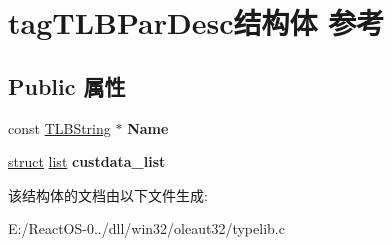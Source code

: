\hypertarget{structtag_t_l_b_par_desc}{}\section{tag\+T\+L\+B\+Par\+Desc结构体 参考}
\label{structtag_t_l_b_par_desc}
\subsection*{Public 属性}
\begin{DoxyCompactItemize}
\item 
\mbox{\label{structtag_t_l_b_par_desc_a1f72b7d90bea7bc353c17fa0c8aed5b8}} 
const \hyperlink{structtag_t_l_b_string}{T\+L\+B\+String} $\ast$ {\bfseries Name}
\item 
\mbox{\label{structtag_t_l_b_par_desc_ac4396f0a53a9a51f304d7007004fb92d}} 
\hyperlink{interfacestruct}{struct} \hyperlink{classlist}{list} {\bfseries custdata\+\_\+list}
\end{DoxyCompactItemize}


该结构体的文档由以下文件生成\+:\begin{DoxyCompactItemize}
\item 
E\+:/\+React\+O\+S-\/0../dll/win32/oleaut32/typelib.\+c\end{DoxyCompactItemize}
